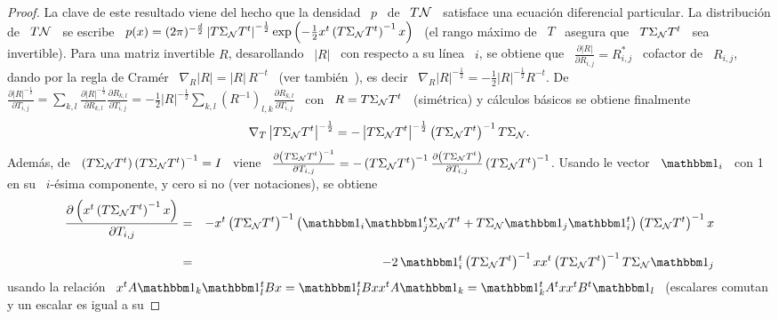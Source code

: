 \begin{proof}
  La clave de este resultado viene del hecho que la densidad \ $p$ \ de \ $T \mathcal{N}$
  \ satisface una ecuaci\'on diferencial  particular.  La distribuci\'on de \ $T
  \mathcal{N}$  \ se  escribe \  $p(x) =  (2 \pi)^{-\frac{d}{2}}  \left| T  \Sigma_{\mathcal{N}} T^t
  \right|^{-\frac12}   \exp\left(  -   \frac12  x^t   \left(  T   \Sigma_{\mathcal{N}}  T^t
    \right)^{-1} x  \right)$ \ (el rango  m\'aximo de \  $T$ \ asegura que  \ $T
  \Sigma_{\mathcal{N}}  T^t$   \  sea  invertible).    Para  una  matriz   invertible  $R$,
  desarollando \  $|R|$ \  con respecto  a su l\'inea  \ $i$,  se obtiene  que \
  $\frac{\partial |R|}{\partial R_{i,j}} = R_{i,j}^*$ \ cofactor de \ $R_{i,j}$,
  dando  por la  regla de  Cram\'er \  $\nabla_R  |R| =  |R| \,  R^{-t}$ \  (ver
  tambi\'en~\cite[cap.~1~\&~9]{MagNeu99}), es decir \ $\nabla_R |R|^{-\frac12} =
  -\frac12 |R|^{-\frac12}  R^{-t}$.  De $\frac{\partial |R|^{-\frac12}}{\partial
    T_{i,j}}  =   \sum_{k,l}  \frac{\partial  |R|^{-\frac12}}{\partial  R_{k,l}}
  \frac{\partial R_{k,l}}{\partial T_{i,j}} = -\frac12 |R|^{-\frac12} \sum_{k,l}
  \left( R^{-1} \right)_{l,k} \frac{\partial R_{k,l}}{\partial T_{i,j}}$ \ con \
  $R  = T  \Sigma_{\mathcal{N}}  T^t$ \  (sim\'etrica)  y c\'alculos  b\'asicos se  obtiene
  finalmente
  \[
  \nabla_T  \left|   T  \Sigma_{\mathcal{N}}  T^t  \right|^{-\frac12}  =   -  \left|  T
    \Sigma_{\mathcal{N}} T^t \right|^{-\frac12} \left( T \Sigma_{\mathcal{N}} T^t \right)^{-1}
  T \Sigma_{\mathcal{N}}.
  \]
  Adem\'as, de \ $\left( T  \Sigma_{\mathcal{N}} T^t \right) \left( T \Sigma_{\mathcal{N}} T^t
  \right)^{-1}  =  I$ \  viene  \  $\frac{\partial  \left( T  \Sigma_{\mathcal{N}}  T^t
    \right)^{-1}}{\partial T_{i,j}} = -  \left( T \Sigma_{\mathcal{N}} T^t \right)^{-1}
  \frac{\partial \left( T \Sigma_{\mathcal{N}}  T^t \right)}{\partial T_{i,j}} \left( T
    \Sigma_{\mathcal{N}} T^t \right)^{-1}$.  Usando le vector \ $\un_i$ \ con 1 en su \
  $i$-\'esima componente, y cero si no (ver notaciones), se obtiene
  \begin{eqnarray*}
  \frac{\partial \left( x^t \left( T \Sigma_\N T^t \right)^{-1} x
  \right)}{\partial T_{i,j}} & = & - x^t \left( T \Sigma_\N T^t \right)^{-1}
  \left( \un_i \un_j^t \Sigma_\N T^t + T \Sigma_\N \un_j \un_i^t \right) \left( T
  \Sigma_\N T^t \right)^{-1} x\\[2.5mm]
  & = & - 2 \, \un_i^t \left( T \Sigma_\N T^t \right)^{-1} x x^t \left( T
  \Sigma_\N T^t \right)^{-1} T \Sigma_\N \un_j
  \end{eqnarray*}
  usando la relaci\'on  \ $x^t A \un_k \un_l^t B  x = \un_l^t B x  x^t A \un_k =
  \un_k^t A^t x x^t  B^t \un_l$ \ (escalares comutan y un  escalar es igual a su

\end{proof}
